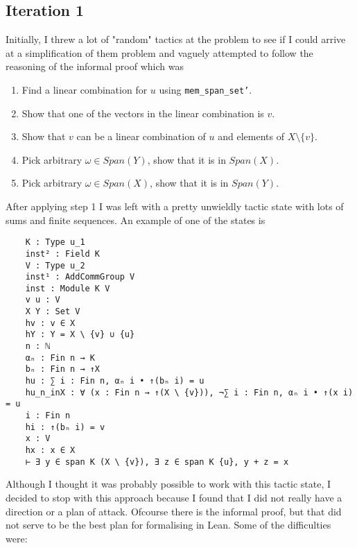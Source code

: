 \documentclass{article}
\begin{document}
\subsection{Iteration 1}


Initially, I threw a lot of "random" tactics at the problem to see if I could arrive at a simplification of them problem and vaguely attempted to follow the reasoning of the informal proof which was

\begin{enumerate}
    \item Find a linear combination for \(u\) using \texttt{mem\_span\_set'}.
    
    \item Show that one of the vectors in the linear combination is \(v\).
    
    \item Show that \(v\) can be a linear combination of \(u\) and elements of \(X \setminus \{v\} \).
    
    \item Pick arbitrary \(\omega \in Span(Y)\), show that it is in \(Span(X)\).

    \item Pick arbitrary \(\omega \in Span(X)\), show that it is in \(Span(Y)\).
\end{enumerate}

After applying step 1 I was left with a pretty unwieldly tactic state with lots of sums and finite sequences. An example of one of the states is

\begin{lstlisting}
    K : Type u_1
    inst² : Field K
    V : Type u_2
    inst¹ : AddCommGroup V
    inst : Module K V
    v u : V
    X Y : Set V
    hv : v ∈ X
    hY : Y = X \ {v} ∪ {u}
    n : ℕ
    αₙ : Fin n → K
    bₙ : Fin n → ↑X
    hu : ∑ i : Fin n, αₙ i • ↑(bₙ i) = u
    hu_n_inX : ∀ (x : Fin n → ↑(X \ {v})), ¬∑ i : Fin n, αₙ i • ↑(x i) = u
    i : Fin n
    hi : ↑(bₙ i) = v
    x : V
    hx : x ∈ X
    ⊢ ∃ y ∈ span K (X \ {v}), ∃ z ∈ span K {u}, y + z = x
\end{lstlisting}

Although I thought it was probably possible to work with this tactic state, I decided to stop with this approach because I found that I did not really have a direction or a plan of attack. Ofcourse there is the informal proof, but that did not serve to be the best plan for formalising in Lean. Some of the difficulties were:
\end{document}

